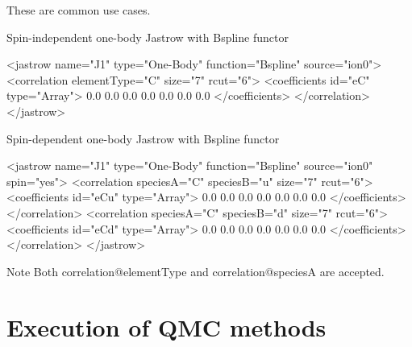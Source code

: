 These are common use cases. 
\begin{DoxyItemize}
\item Spin-\/independent one-\/body Jastrow with {\ttfamily Bspline} functor 
\begin{DoxyCode}
<jastrow name=\textcolor{stringliteral}{"J1"} type=\textcolor{stringliteral}{"One-Body"} \textcolor{keyword}{function}=\textcolor{stringliteral}{"Bspline"} source=\textcolor{stringliteral}{"ion0"}>
  <correlation elementType=\textcolor{stringliteral}{"C"} size=\textcolor{stringliteral}{"7"} rcut=\textcolor{stringliteral}{"6"}>
    <coefficients \textcolor{keywordtype}{id}=\textcolor{stringliteral}{"eC"} type=\textcolor{stringliteral}{"Array"}> 
    0.0 0.0 0.0 0.0 0.0 0.0 0.0
    </coefficients>
  </correlation>
</jastrow>
\end{DoxyCode}
  
\item Spin-\/dependent one-\/body Jastrow with {\ttfamily Bspline} functor 
\begin{DoxyCode}
<jastrow name=\textcolor{stringliteral}{"J1"} type=\textcolor{stringliteral}{"One-Body"} \textcolor{keyword}{function}=\textcolor{stringliteral}{"Bspline"} source=\textcolor{stringliteral}{"ion0"} spin=\textcolor{stringliteral}{"yes"}>
  <correlation speciesA=\textcolor{stringliteral}{"C"} speciesB=\textcolor{stringliteral}{"u"} size=\textcolor{stringliteral}{"7"} rcut=\textcolor{stringliteral}{"6"}>
    <coefficients \textcolor{keywordtype}{id}=\textcolor{stringliteral}{"eCu"} type=\textcolor{stringliteral}{"Array"}> 
    0.0 0.0 0.0 0.0 0.0 0.0 0.0
    </coefficients>
  </correlation>
  <correlation speciesA=\textcolor{stringliteral}{"C"} speciesB=\textcolor{stringliteral}{"d"} size=\textcolor{stringliteral}{"7"} rcut=\textcolor{stringliteral}{"6"}>
    <coefficients \textcolor{keywordtype}{id}=\textcolor{stringliteral}{"eCd"} type=\textcolor{stringliteral}{"Array"}> 
    0.0 0.0 0.0 0.0 0.0 0.0 0.0
    </coefficients>
  </correlation>
</jastrow>
\end{DoxyCode}
  
\end{DoxyItemize}

\begin{DoxyNote}{Note}
Both {\ttfamily correlation@element\-Type} and {\ttfamily correlation@species\-A} are accepted.
\end{DoxyNote}
\section{Execution of Q\-M\-C methods}\label{a00004_actionX}
